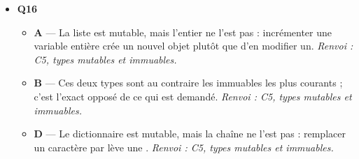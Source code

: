 \begin{itemize}
  \item \textbf{Q16}
  \begin{itemize}
    \item \textbf{A} — La liste est mutable, mais l'entier ne l'est pas : incrémenter une variable entière crée un nouvel objet plutôt que d'en modifier un. \emph{Renvoi : C5, types mutables et immuables.}
    \item \textbf{B} — Ces deux types sont au contraire les immuables les plus courants ; c'est l'exact opposé de ce qui est demandé. \emph{Renvoi : C5, types mutables et immuables.}
    \item \textbf{D} — Le dictionnaire est mutable, mais la chaîne ne l'est pas : remplacer un caractère par  lève une . \emph{Renvoi : C5, types mutables et immuables.}
  \end{itemize}
\end{itemize}
\fi
